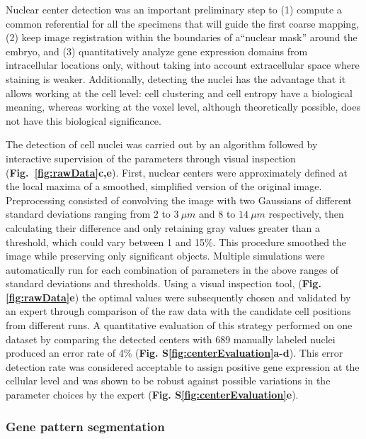 Nuclear center detection was an important preliminary step to (1) compute a common referential for all the specimens that will guide the first coarse mapping, (2) keep image registration within the boundaries of a``nuclear mask'' around the embryo, and (3) quantitatively analyze gene expression domains from intracellular locations only, without taking into account extracellular space where staining is weaker. Additionally, detecting the nuclei has the advantage that it allows working at the cell level: cell clustering and cell entropy have a biological meaning, whereas working at the voxel level, although theoretically possible, does not have this biological significance.

The detection of cell nuclei was carried out by an algorithm followed by interactive supervision of the parameters through visual inspection (\textbf{Fig.~\ref{fig:rawData}c,e}). First, nuclear centers were approximately defined at the local maxima of a smoothed, simplified version of the original image. Preprocessing consisted of convolving the image with two Gaussians of different standard deviations ranging from 2 to $3~\mu m$ and 8 to $14~\mu m$ respectively, then calculating their difference and only retaining gray values greater than a threshold, which could vary between 1 and 15\%. This procedure smoothed the image while preserving only significant objects. Multiple simulations were automatically run for each combination of parameters in the above ranges of standard deviations and thresholds. Using a visual inspection tool, (\textbf{Fig. \ref{fig:rawData}e}) the optimal values were subsequently chosen and validated by an expert through comparison of the raw data with the candidate cell positions from different runs. A quantitative evaluation of this strategy performed on one dataset by comparing the detected centers with 689 manually labeled nuclei produced an error rate of 4\% (\textbf{Fig. S\ref{fig:centerEvaluation}a-d}). This error detection rate was considered acceptable to assign positive gene expression at the cellular level and was shown to be robust against possible variations in the parameter choices by the expert (\textbf{Fig. S\ref{fig:centerEvaluation}e}).

\subsubsection*{Gene pattern segmentation}


